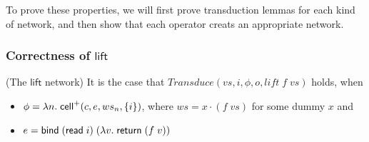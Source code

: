 \noindent To prove these properties, we will first prove transduction lemmas for each kind of 
network, and then show that each operator creats an appropriate network. 

\subsubsection{Correctness of $\mathsf{lift}$}

\begin{lemma}{(The $\mathsf{lift}$ network)}
It is the case that $\mathit{Transduce}(vs, i, \phi, o, \mathit{lift}\;f\;vs)$ holds, when
\begin{itemize}
\item $\phi = \lambda n.\;\mathsf{cell}^{+}({c}, {e}, {ws_n}, {\{{i}\}})$, where $ws = x \cdot (f\;vs)$ for some dummy $x$ and
\item $e = \mathsf{bind}\; (\mathsf{read}\; i)\; (\lambda v.\;\mathsf{return}\; (f\;v))$
\end{itemize}
\end{lemma}


